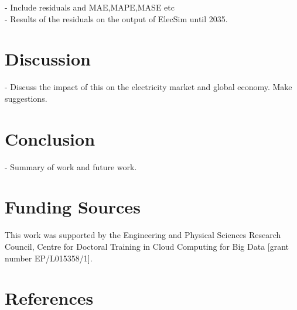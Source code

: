 \documentclass[final,3p,times,twocolumn,numbers]{elsarticle}
\begin{document}
- Include residuals and MAE,MAPE,MASE etc\\

- Results of the residuals on the output of ElecSim until 2035.\\

\section{Discussion}
\label{sec:discussion}

- Discuss the impact of this on the electricity market and global economy. Make suggestions.

\section{Conclusion}
\label{sec:conclusion}

- Summary of work and future work.

\section{Funding Sources}

This work was supported by the Engineering and Physical Sciences Research Council, Centre for Doctoral Training in Cloud Computing for Big Data [grant number EP/L015358/1].







   
  \section*{References}
  


%
%
%
\end{document}
